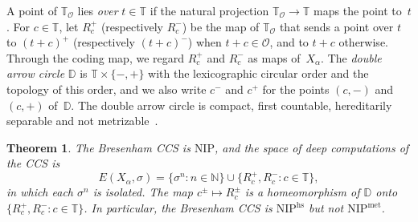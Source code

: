 \documentclass[psamsfonts]{amsart}
\newtheorem{thm}{Theorem}[section]
\theoremstyle{definition}
\theoremstyle{remark}
\newcommand{\NIP}{\text{NIP}}
\numberwithin{equation}{section}
\begin{document}
A point of $\mathbb{T}_{\mathcal{O}}$ lies \emph{over} $t\in\mathbb{T}$ if the natural projection $\mathbb{T}_{\mathcal{O}}\to\mathbb{T}$ maps the point to~$t$.
For $c\in\mathbb{T}$, let $R_c^+$ (respectively $R_c^-$) be the map of $\mathbb{T}_{\mathcal{O}}$ that sends a point over $t$ to $(t+c)^+$ (respectively $(t+c)^-$) when $t+c\in \mathcal{O}$, and to $t+c$ otherwise.
Through the coding map, we regard $R_c^+$ and $R_c^-$ as maps of~$X_\alpha$.
The \emph{double arrow circle} $\mathbb{D}$ is $\mathbb{T}\times\{-,+\}$ with the lexicographic circular order and the topology of this order, and we also write $c^-$ and $c^+$ for the points $(c,-)$ and $(c,+)$ of~$\mathbb{D}$.
The double arrow circle is compact, first countable, hereditarily separable and not metrizable~\cite[3.10.C]{Engelking:1989}.

\begin{thm}\label{thm:Bresenham}
The Bresenham CCS is $\NIP$, and the space of deep computations of the CCS is
\[
E(X_\alpha,\sigma)=\{\sigma^n:n\in\mathbb{N}\}\cup\{R_c^+,R_c^-:c\in\mathbb{T}\},
\]
in which each $\sigma^n$ is isolated.
The map $c^\pm\mapsto R_c^\pm$ is a homeomorphism of $\mathbb{D}$ onto $\{R_c^+,R_c^-:c\in\mathbb{T}\}$.
In particular, the Bresenham CCS is $\NIP^{\mathrm{hs}}$ but not $\NIP^{\mathrm{met}}$.
\end{thm}
\end{document}
